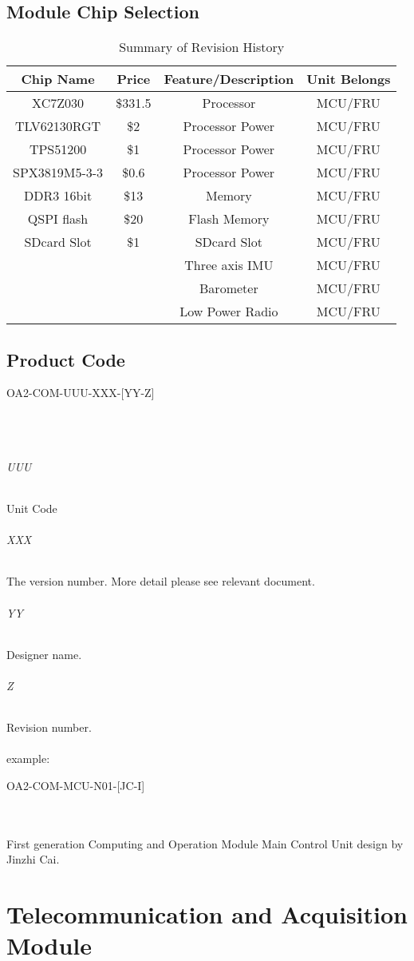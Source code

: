 \documentclass[12pt,article]{memoir}
\begin{document}
\section{Module Chip Selection}
\begin{table}[H]
	\centering
	\begin{tabu}{ c | c | c | c }
		Chip Name & Price & Feature/Description & Unit Belongs\\ \hline
		 XC7Z030 & \$331.5 & Processor & MCU/FRU \\
		 TLV62130RGT & \$2 & Processor Power & MCU/FRU \\
		 TPS51200 & \$1 & Processor Power & MCU/FRU \\
		 SPX3819M5-3-3 & \$0.6 & Processor Power & MCU/FRU \\
		 DDR3 16bit& \$13 & Memory & MCU/FRU \\
		 QSPI flash & \$20 & Flash Memory & MCU/FRU \\
		 SDcard Slot & \$1 & SDcard Slot & MCU/FRU \\
		 &  & Three axis IMU & MCU/FRU \\
		 &  & Barometer & MCU/FRU \\
		 &  & Low Power Radio & MCU/FRU \\
	\end{tabu}
	\caption{Summary of Revision History}
	\label{tab:slc}
\end{table}
\section{Product Code}
\begin{LARGE}
OA2-COM-UUU-XXX-[YY-Z]
\end{LARGE}\\\\
\subparagraph{UUU}
Unit Code
\subparagraph{XXX}
The version number. More detail please see relevant document.
\subparagraph{YY}
Designer name.
\subparagraph{Z}
Revision number.\\\\
example: 
\begin{large}
OA2-COM-MCU-N01-[JC-I]
\end{large}\\\\
First generation Computing and Operation Module Main Control Unit design by Jinzhi Cai.
\newpage
\chapter{Telecommunication and Acquisition Module}
\end{document}
